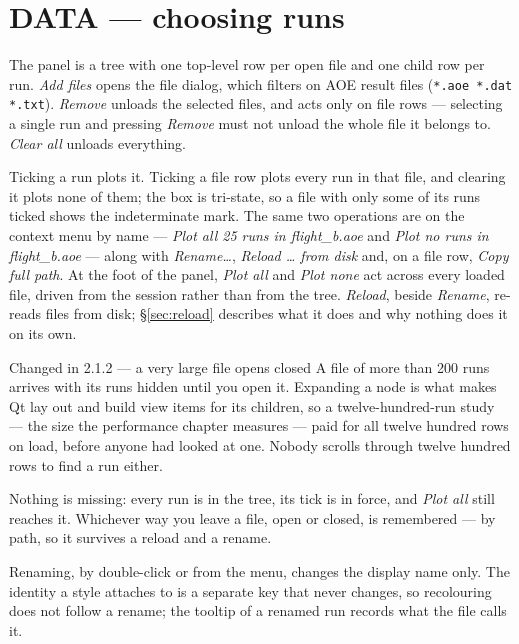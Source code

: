 \documentclass[11pt,a4paper,oneside]{report}
\newcommand{\appver}{2.1.2}
\newcommand{\code}[1]{\texttt{#1}}
\begin{document}
\section{DATA --- choosing runs}
\label{sec:data}

The panel is a tree with one top-level row per open file and one child row per
run. \emph{Add files} opens the file dialog, which filters on AOE result files
(\code{*.aoe *.dat *.txt}). \emph{Remove} unloads the selected files, and acts
only on file rows --- selecting a single run and pressing \emph{Remove} must not
unload the whole file it belongs to. \emph{Clear all} unloads everything.

Ticking a run plots it. Ticking a file row plots every run in that file, and
clearing it plots none of them; the box is tri-state, so a file with only some of
its runs ticked shows the indeterminate mark. The same two operations are on the
context menu by name --- \emph{Plot all 25 runs in flight\_b.aoe} and \emph{Plot
no runs in flight\_b.aoe} --- along with \emph{Rename\ldots}, \emph{Reload
\ldots{} from disk} and, on a file row, \emph{Copy full path}. At the foot of
the panel, \emph{Plot all} and \emph{Plot none} act across every loaded file,
driven from the session rather than from the tree. \emph{Reload}, beside
\emph{Rename}, re-reads files from disk; \S\ref{sec:reload} describes what it
does and why nothing does it on its own.

\begin{aoenew}{Changed in \appver{} --- a very large file opens closed}
A file of more than 200 runs arrives with its runs hidden until you open it.
Expanding a node is what makes Qt lay out and build view items for its
children, so a twelve-hundred-run study --- the size the performance chapter
measures --- paid for all twelve hundred rows on load, before anyone had looked
at one. Nobody scrolls through twelve hundred rows to find a run either.

Nothing is missing: every run is in the tree, its tick is in force, and
\emph{Plot all} still reaches it. Whichever way you leave a file, open or
closed, is remembered --- by path, so it survives a reload and a rename.
\end{aoenew}

Renaming, by double-click or from the menu, changes the display name only. The
identity a style attaches to is a separate key that never changes, so
recolouring does not follow a rename; the tooltip of a renamed run records what
the file calls it.
\end{document}
